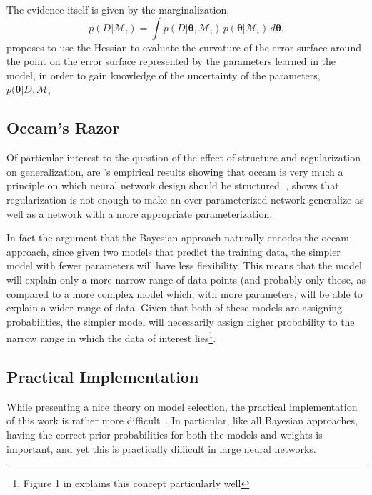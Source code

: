 \documentclass[thesis]{subfiles}
\begin{document}
The evidence itself is given by the marginalization,
\begin{equation}
	p(D|\mathcal{M}_i) = \int p(D|\mathbf{\theta},\mathcal{M}_i)\,p(\mathbf{\theta}|\mathcal{M}_i)\,d\mathbf{\theta}.
\end{equation}
 proposes to use the Hessian to evaluate the curvature of the error surface around the point on the error surface represented by the parameters learned in the model, in order to gain knowledge of the uncertainty of the parameters, \ie{}$p(\mathbf{\theta}|D,\mathcal{M}_i$

\subsection{Occam's Razor}
Of particular interest to the question of the effect of structure and regularization on generalization, are \citeauthor{MacKay91}'s empirical results showing that \gls{occam} is very much a principle on which neural network design should be structured. \citet[]{MacKay91}, shows that regularization is not enough to make an over-parameterized network generalize as well as a network with a more appropriate parameterization.

In fact \citeauthor{mackay1992practical} the argument that the Bayesian approach naturally encodes the \gls{occam} approach, since given two models that predict the training data, the simpler model with fewer parameters will have less flexibility. This means that the model will explain only a more narrow range of data points (and probably only those, as compared to a more complex model which, with more parameters, will be able to explain a wider range of data. Given that both of these models are assigning probabilities, the simpler model will necessarily assign higher probability to the narrow range in which the data of interest lies\footnote{Figure 1 in \citet{mackay1995} explains this concept particularly well}.


\subsection{Practical Implementation}
While presenting a nice theory on model selection, the practical implementation of this work is rather more difficult~\citep{chipman2001}. In particular, like all Bayesian approaches, having the correct prior probabilities for both the models and weights is important, and yet this is practically difficult in large neural networks.
\end{document}
